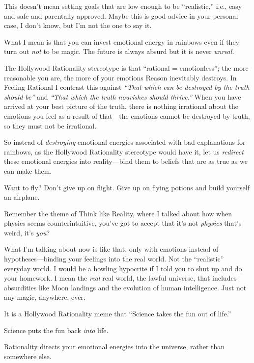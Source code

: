 {
 This doesn't mean setting goals that are low
enough to be ``realistic,'' i.e.,
easy and safe and parentally approved. Maybe this is good advice in
your personal case, I don't know, but
I'm not the one to say it.}

{
 What I mean is that you can invest emotional energy in rainbows
even if they turn out \textit{not} to be magic. The future is always
absurd but it is never \textit{unreal.}}

{
 The Hollywood Rationality stereotype is that
``rational = emotionless''; the more
reasonable you are, the more of your emotions Reason inevitably
destroys. In Feeling Rational I contrast this against
\textit{``That which can be destroyed by the truth
should be''} and \textit{``That
which the truth nourishes should thrive.''} When you
have arrived at your best picture of the truth, there is nothing
irrational about the emotions you feel as a result of that---the
emotions cannot be destroyed by truth, so they must not be irrational.}

{
 So instead of \textit{destroying} emotional energies associated
with bad explanations for rainbows, as the Hollywood Rationality
stereotype would have it, let us \textit{redirect} these emotional
energies into reality---bind them to beliefs that are as true as we can
make them.}

{
 Want to fly? Don't give up on flight. Give up on
flying potions and build yourself an airplane.}

{
 Remember the theme of Think like Reality, where I talked about how
when physics seems counterintuitive, you've got to
accept that it's not \textit{physics}
that's weird, it's \textit{you}?}

{
 What I'm talking about now is like that, only with
emotions instead of hypotheses---binding your feelings into the real
world. Not the ``realistic''
everyday world. I would be a howling hypocrite if I told you to shut up
and do your homework. I mean the \textit{real} real world, the lawful
universe, that includes absurdities like Moon landings and the
evolution of human intelligence. Just not any magic, anywhere, ever.}

{
 It is a Hollywood Rationality meme that ``Science
takes the fun out of life.''}

{
 Science puts the fun back \textit{into} life.}

{
 Rationality directs your emotional energies into the universe,
rather than somewhere else.}

\myendsectiontext


